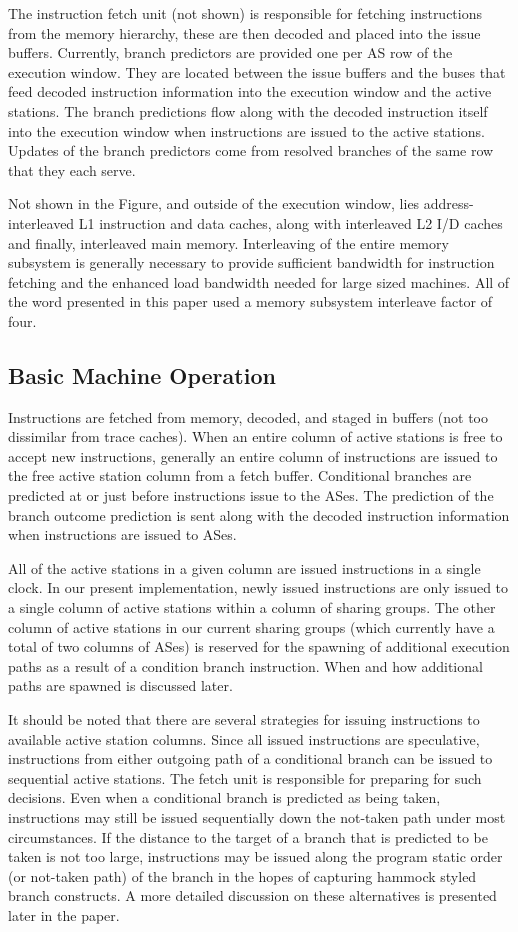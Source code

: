 \documentclass[10pt,dvips]{article}
\begin{document}
The instruction fetch unit (not shown) is responsible for
fetching instructions from the memory hierarchy, these are then decoded
and placed into the issue buffers.   
Currently, branch predictors are provided one per AS row of the execution
window.  
They are located between the issue buffers and the buses that feed
decoded instruction information into the execution window and the
active stations.  
The branch predictions flow along with
the decoded instruction itself into the
execution window when instructions are issued to the active stations.
Updates of the branch predictors come from resolved branches
of the same row that they each serve.

Not shown in the Figure, and outside of the execution window,
lies address-interleaved L1 instruction and data caches, along with
interleaved L2 I/D caches and finally, interleaved main memory.
Interleaving of the entire memory subsystem is generally necessary
to provide sufficient bandwidth for instruction fetching and the
enhanced load bandwidth needed for large sized machines.
All of the word presented in this paper used a memory subsystem
interleave factor of four.
%
\subsection{Basic Machine Operation}
%
Instructions are fetched from memory, decoded, and staged in buffers
(not too dissimilar from trace caches).  
When an entire column
of active stations is free to accept new instructions, generally
an entire column of instructions are issued to the free active station
column from a fetch buffer.
Conditional branches are
predicted at or just before instructions issue to the ASes.
The prediction of the branch outcome 
prediction is sent along with the
decoded instruction information when instructions are issued to
ASes.

All of the active stations in a given column are issued instructions
in a single clock.  
In our present implementation, newly issued instructions
are only issued to a single column of active stations within
a column of sharing groups.  The other column of active stations
in our current sharing groups (which currently have a total
of two columns of ASes) is reserved for the spawning of additional
execution paths as a result of a condition branch instruction.
When and how additional paths are spawned is discussed later.

It should be noted that there are several strategies for
issuing instructions to available active station columns.
Since all issued instructions are speculative, instructions
from either outgoing path of a conditional branch can be issued
to sequential active stations.
The fetch unit is responsible for preparing for such decisions.
Even when a conditional branch is predicted as being taken,
instructions may still be issued sequentially down the not-taken
path under most circumstances.  If the distance to the target 
of a branch
that is predicted to be taken is not too large,
instructions may be issued along the program static order (or not-taken
path) of the branch in the hopes of capturing hammock styled branch
constructs.  A more detailed discussion on these alternatives is
presented later in the paper.
\end{document}
